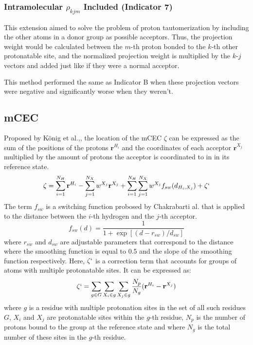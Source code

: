 \documentclass{article}
\newcommand{\mb}[1]{\mathbf{#1}}
\begin{document}
\subsubsection{Intramolecular $\rho_{kjm}$ Included (Indicator 7)}\label{ss:indicator7}
This extension aimed to solve the problem of proton tautomerization by including the other atoms in a donor group as possible acceptors.
Thus, the projection weight would be calculated between the $m$-th proton bonded to the $k$-th other protonatable site, and the normalized projection weight is multiplied by the $k$-$j$ vectors and added just like if they were a normal acceptor.

This method performed the same as Indicator B when these projection vectors were negative and significantly worse when they weren't.

\subsection{mCEC}
Proposed by K\"onig et al.,\cite{Konig2006}, the location of the mCEC $\zeta$ can be expressed as the sum of the positions of the protons $\mb{r}^{H_i}$ and the coordinates of each acceptor $\mb{r}^{X_j}$ multiplied by the amount of protons the acceptor is coordinated to in in its reference state.
\begin{equation}\label{eq:mcec}
\mb{\zeta} = \sum_{i=1}^{N_H} \mb{r}^{H_i} - \sum_{j=1}^{N_X} w^{X_j} \mb{r}^{X_j} + \sum_{i=1}^{N_H} \sum_{j=1}^{N_X} w^{X_j} f_{sw}(d_{H_i,X_j}) + \zeta`
\end{equation}
The term $f_{sw}$ is a switching function probosed by Chakrabarti al.\cite{Chakrabarti2004} that is applied to the distance between the $i$-th hydrogen and the $j$-th acceptor.
\begin{equation}\label{eq:chakra}
f_{sw}(d) = \frac{1}{1 + \exp[(d-r_{sw})/d_{sw}]}
\end{equation}
where $r_{sw}$ and $d_{sw}$ are adjustable parameters that correspond to the distance where the smoothing function is equal to 0.5 and the slope of the smoothing function respectively.
Here, $\zeta`$ is a correction term that accounts for groups of atoms with multiple protonatable sites. It can be expressed as:
\begin{equation}
\mb{\zeta}` = \sum_{g \in G} \sum_{X_i\in g}\sum_{X_j \in g} \frac{N_p}{N_g} (\mb{r}^{H_i} - \mb{r}^{X_j})
\end{equation}
where $g$ is a residue with multiple protonation sites in the set of all such residues $G$, $X_i$ and $X_j$ are protonatable sites within the $g$-th residue, $N_p$ is the number of protons bound to the group at the reference state and where $N_g$ is the total number of these sites in the $g$-th residue. 
\end{document}
